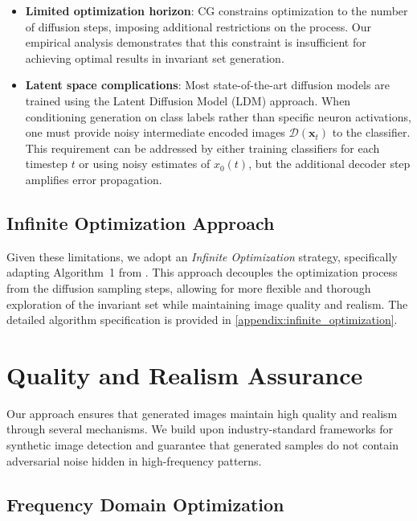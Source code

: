 \documentclass[licencjacka,en]{pracamgr}
\begin{document}
\begin{itemize}
  \item \textbf{Limited optimization horizon}: CG constrains optimization to the number of diffusion steps, imposing additional restrictions on the process. Our empirical analysis demonstrates that this constraint is insufficient for achieving optimal results in invariant set generation.
  \item \textbf{Latent space complications}: Most state-of-the-art diffusion models \cite{paperswithcode_imagenet} are trained using the Latent Diffusion Model (LDM) approach. When conditioning generation on class labels rather than specific neuron activations, one must provide noisy intermediate encoded images $\mathcal{D}(\mathbf{x}_t)$ to the classifier. This requirement can be addressed by either training classifiers for each timestep $t$ or using noisy estimates of $x_0(t)$, but the additional decoder step amplifies error propagation.
\end{itemize}

\subsection{Infinite Optimization Approach}

Given these limitations, we adopt an \textit{Infinite Optimization} strategy, specifically adapting Algorithm~1 from \cite{augustin2024digindiffusionguidanceinvestigating}. This approach decouples the optimization process from the diffusion sampling steps, allowing for more flexible and thorough exploration of the invariant set while maintaining image quality and realism. The detailed algorithm specification is provided in \cref{appendix:infinite_optimization}.

\section{Quality and Realism Assurance}\label{method:quality_realism}

Our approach ensures that generated images maintain high quality and realism through several mechanisms. We build upon industry-standard frameworks for synthetic image detection and guarantee that generated samples do not contain adversarial noise hidden in high-frequency patterns.

\subsection{Frequency Domain Optimization}
\end{document}
